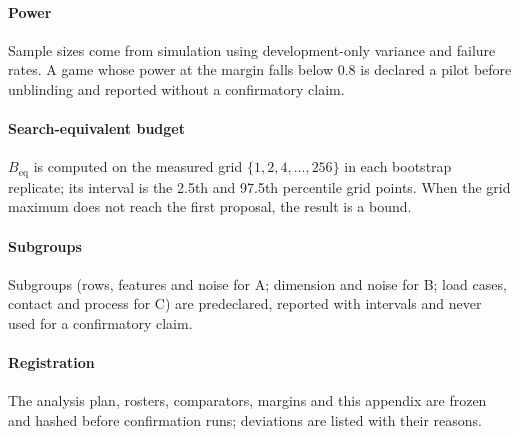 \paragraph{Power} Sample sizes come from simulation using development-only variance and failure
rates. A game whose power at the margin falls below 0.8 is declared a pilot before unblinding and
reported without a confirmatory claim.

\paragraph{Search-equivalent budget} $B_{\mathrm{eq}}$ is computed on the measured grid
$\{1,2,4,\ldots,256\}$ in each bootstrap replicate; its interval is the 2.5th and 97.5th
percentile grid points. When the grid maximum does not reach the first proposal, the result is a bound.

\paragraph{Subgroups} Subgroups (rows, features and noise for A; dimension and noise for B; load cases,
contact and process for C) are predeclared, reported with intervals and never used for a confirmatory
claim.

\paragraph{Registration} The analysis plan, rosters, comparators, margins and this appendix are
frozen and hashed before confirmation runs; deviations are listed with their reasons.
